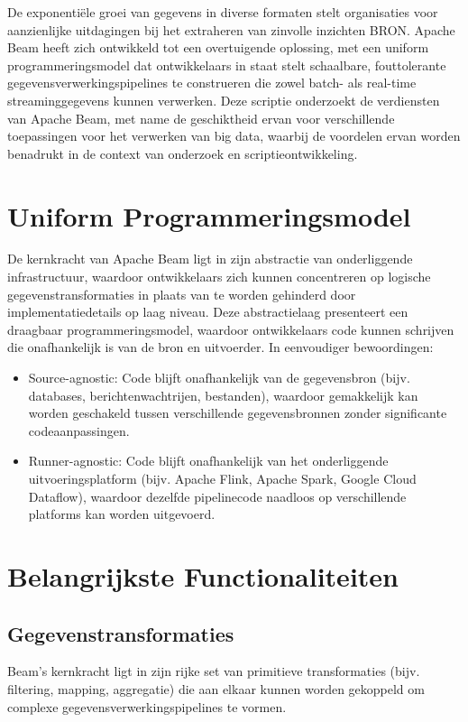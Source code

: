 De exponentiële groei van gegevens in diverse formaten stelt organisaties voor aanzienlijke uitdagingen bij het extraheren van zinvolle inzichten {BRON}. Apache Beam heeft zich ontwikkeld tot een overtuigende oplossing, met een uniform programmeringsmodel dat ontwikkelaars in staat stelt schaalbare, fouttolerante gegevensverwerkingspipelines te construeren die zowel batch- als real-time streaminggegevens kunnen verwerken. Deze scriptie onderzoekt de verdiensten van Apache Beam, met name de geschiktheid ervan voor verschillende toepassingen voor het verwerken van big data, waarbij de voordelen ervan worden benadrukt in de context van onderzoek en scriptieontwikkeling.

\section{Uniform Programmeringsmodel}

De kernkracht van Apache Beam ligt in zijn abstractie van onderliggende infrastructuur, waardoor ontwikkelaars zich kunnen concentreren op logische gegevenstransformaties in plaats van te worden gehinderd door implementatiedetails op laag niveau. Deze abstractielaag presenteert een draagbaar programmeringsmodel, waardoor ontwikkelaars code kunnen schrijven die onafhankelijk is van de bron en uitvoerder. In eenvoudiger bewoordingen:
\begin{itemize}
    \item Source-agnostic: Code blijft onafhankelijk van de gegevensbron (bijv. databases, berichtenwachtrijen, bestanden), waardoor gemakkelijk kan worden geschakeld tussen verschillende gegevensbronnen zonder significante codeaanpassingen.
    \item Runner-agnostic: Code blijft onafhankelijk van het onderliggende uitvoeringsplatform (bijv. Apache Flink, Apache Spark, Google Cloud Dataflow), waardoor dezelfde pipelinecode naadloos op verschillende platforms kan worden uitgevoerd.
\end{itemize}

\section{Belangrijkste Functionaliteiten}

\subsection{Gegevenstransformaties}
Beam's kernkracht ligt in zijn rijke set van primitieve transformaties (bijv. filtering, mapping, aggregatie) die aan elkaar kunnen worden gekoppeld om complexe gegevensverwerkingspipelines te vormen.

